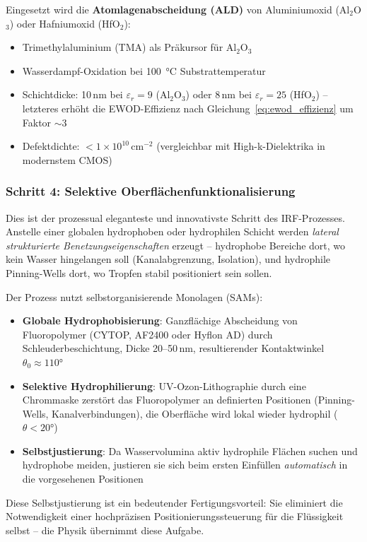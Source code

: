 ﻿\documentclass[a4paper,12pt]{scrreprt}
\theoremstyle{definition}
\begin{document}
Eingesetzt wird die \textbf{Atomlagenabscheidung (ALD)} von Aluminiumoxid
(Al$_2$O$_3$) oder Hafniumoxid (HfO$_2$):
\begin{itemize}
	\item Trimethylaluminium (TMA) als Präkursor für Al$_2$O$_3$
	\item Wasserdampf-Oxidation bei 100\, °C Substrattemperatur
	\item Schichtdicke: 10\,nm bei $\varepsilon_r = 9$ (Al$_2$O$_3$)
	oder 8\,nm bei $\varepsilon_r = 25$ (HfO$_2$) -- letzteres
	erhöht die EWOD-Effizienz nach Gleichung~\eqref{eq:ewod_effizienz}
	um Faktor $\sim$3
	\item Defektdichte: $< 1 \times 10^{10}$\,cm$^{-2}$ (vergleichbar
	mit High-k-Dielektrika in modernstem CMOS)
\end{itemize}

\subsubsection{Schritt 4: Selektive Oberflächenfunktionalisierung}

Dies ist der prozessual eleganteste und innovativste Schritt des IRF-Prozesses.
Anstelle einer globalen hydrophoben oder hydrophilen Schicht werden
\emph{lateral strukturierte Benetzungseigenschaften} erzeugt -- hydrophobe
Bereiche dort, wo kein Wasser hingelangen soll (Kanalabgrenzung, Isolation),
und hydrophile Pinning-Wells dort, wo Tropfen stabil positioniert sein sollen.

Der Prozess nutzt selbstorganisierende Monolagen (SAMs):
\begin{itemize}
	\item \textbf{Globale Hydrophobisierung}: Ganzflächige Abscheidung von
	Fluoropolymer (CYTOP, AF2400 oder Hyflon AD) durch Schleuderbeschichtung,
	Dicke 20--50\,nm, resultierender Kontaktwinkel $\theta_0 \approx 110 °$
	\item \textbf{Selektive Hydrophilierung}: UV-Ozon-Lithographie durch eine
	Chrommaske zerstört das Fluoropolymer an definierten Positionen
	(Pinning-Wells, Kanalverbindungen), die Oberfläche wird lokal
	wieder hydrophil ($\theta < 20 °$)
	\item \textbf{Selbstjustierung}: Da Wasservolumina aktiv hydrophile
	Flächen suchen und hydrophobe meiden, justieren sie sich beim
	ersten Einfüllen \emph{automatisch} in die vorgesehenen Positionen
\end{itemize}

Diese Selbstjustierung ist ein bedeutender Fertigungsvorteil: Sie eliminiert
die Notwendigkeit einer hochpräzisen Positionierungssteuerung für die
Flüssigkeit selbst -- die Physik übernimmt diese Aufgabe.
\end{document}
